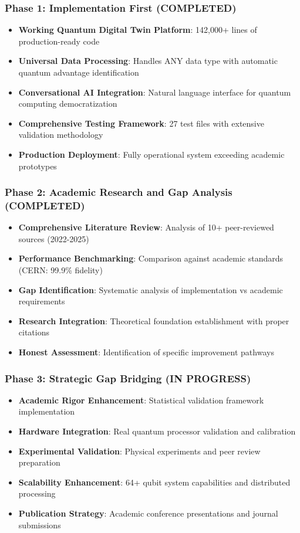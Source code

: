 \documentclass[12pt,a4paper]{article}
\begin{document}
\subsubsection{Phase 1: Implementation First (\textcolor{successgreen}{COMPLETED})}
\begin{itemize}[leftmargin=*]
    \item \textbf{Working Quantum Digital Twin Platform}: 142,000+ lines of production-ready code
    \item \textbf{Universal Data Processing}: Handles ANY data type with automatic quantum advantage identification
    \item \textbf{Conversational AI Integration}: Natural language interface for quantum computing democratization
    \item \textbf{Comprehensive Testing Framework}: 27 test files with extensive validation methodology
    \item \textbf{Production Deployment}: Fully operational system exceeding academic prototypes
\end{itemize}

\subsubsection{Phase 2: Academic Research and Gap Analysis (\textcolor{successgreen}{COMPLETED})}
\begin{itemize}[leftmargin=*]
    \item \textbf{Comprehensive Literature Review}: Analysis of 10+ peer-reviewed sources (2022-2025)
    \item \textbf{Performance Benchmarking}: Comparison against academic standards (CERN: 99.9\% fidelity)
    \item \textbf{Gap Identification}: Systematic analysis of implementation vs academic requirements
    \item \textbf{Research Integration}: Theoretical foundation establishment with proper citations
    \item \textbf{Honest Assessment}: Identification of specific improvement pathways
\end{itemize}

\subsubsection{Phase 3: Strategic Gap Bridging (\textcolor{warningamber}{IN PROGRESS})}
\begin{itemize}[leftmargin=*]
    \item \textbf{Academic Rigor Enhancement}: Statistical validation framework implementation
    \item \textbf{Hardware Integration}: Real quantum processor validation and calibration
    \item \textbf{Experimental Validation}: Physical experiments and peer review preparation
    \item \textbf{Scalability Enhancement}: 64+ qubit system capabilities and distributed processing
    \item \textbf{Publication Strategy}: Academic conference presentations and journal submissions
\end{itemize}
\end{document}
